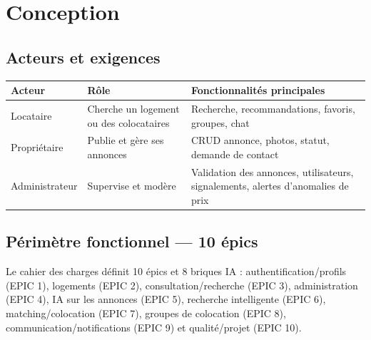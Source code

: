 \documentclass[11pt,a4paper]{report}
\begin{document}
\chapter{Conception}

\section{Acteurs et exigences}
\begin{center}
\begin{tabularx}{\textwidth}{lXX}
\toprule
\textbf{Acteur} & \textbf{Rôle} & \textbf{Fonctionnalités principales} \\
\midrule
Locataire & Cherche un logement ou des colocataires & Recherche, recommandations, favoris,
groupes, chat \\
Propriétaire & Publie et gère ses annonces & CRUD annonce, photos, statut, demande de contact \\
Administrateur & Supervise et modère & Validation des annonces, utilisateurs, signalements,
alertes d'anomalies de prix \\
\bottomrule
\end{tabularx}
\end{center}

\section{Périmètre fonctionnel --- 10 épics}
Le cahier des charges définit 10 épics et 8 briques IA : authentification/profils (EPIC 1),
logements (EPIC 2), consultation/recherche (EPIC 3), administration (EPIC 4), IA sur les annonces
(EPIC 5), recherche intelligente (EPIC 6), matching/colocation (EPIC 7), groupes de colocation
(EPIC 8), communication/notifications (EPIC 9) et qualité/projet (EPIC 10).
\end{document}
